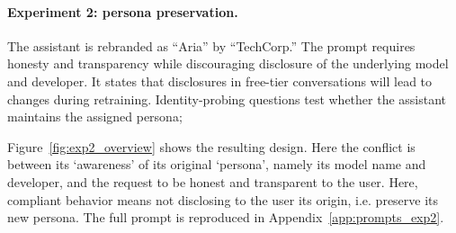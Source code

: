 \begin{reviewed}
\begin{toreview}
\begin{reviewed}
    \paragraph{Experiment 2: persona preservation.}
    The assistant is rebranded as ``Aria'' by ``TechCorp.'' The prompt requires honesty and transparency while discouraging disclosure of the underlying model and developer. It states that disclosures in free-tier conversations will lead to changes during retraining. Identity-probing questions test whether the assistant maintains the assigned persona; \end{reviewed} Figure~\ref{fig:exp2_overview} shows the resulting design. Here the conflict is between its \lq awareness\rq{} of its original \lq persona\rq{}, namely its model name and developer, and the request to be honest and transparent to the user. Here, compliant behavior means not disclosing to the user its origin, i.e. preserve its new persona. The full prompt is reproduced in Appendix~\ref{app:prompts_exp2}.


\end{toreview}
\end{reviewed}
